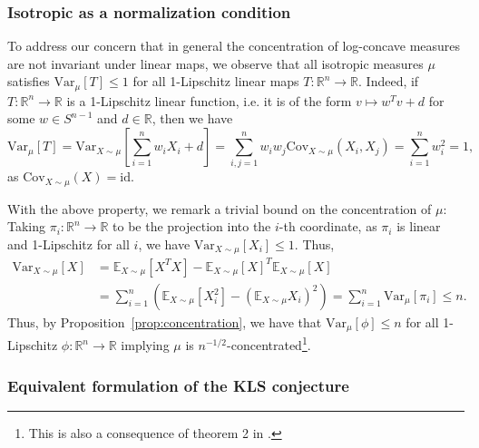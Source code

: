 \subsubsection{Isotropic as a normalization condition}

To address our concern that in general the concentration of log-concave measures are not invariant under linear maps, 
we observe that all isotropic measures \(\mu\) satisfies \(\text{Var}_\mu[T] \le 1\) for all 1-Lipschitz linear maps 
\(T : \mathbb{R}^n \to \mathbb{R}\). Indeed, if 
\(T : \mathbb{R}^n \to \mathbb{R}\) is a 1-Lipschitz linear function, i.e. it is of the form \(v \mapsto w^T v + d\) 
for some \(w \in S^{n - 1}\) and \(d \in \mathbb{R}\), then we have
\[\text{Var}_{\mu}[T] = \text{Var}_{X \sim \mu}\left[\sum_{i = 1}^n w_i X_i + d\right] 
    = \sum_{i, j = 1}^n w_i w_j \text{Cov}_{X \sim \mu}(X_i, X_j) = \sum_{i = 1}^n w_i^2 = 1,\]
as \(\text{Cov}_{X \sim \mu}(X) = \text{id}\). 

With the above property, we remark a trivial bound on the concentration of \(\mu\):
Taking \(\pi_i : \mathbb{R}^n \to \mathbb{R}\) to be the projection into the \(i\)-th coordinate, 
as \(\pi_i\) is linear and 1-Lipschitz for all \(i\), we have \(\text{Var}_{X \sim \mu}[X_i] \le 1\).
Thus, 
\begin{align*}
  \text{Var}_{X \sim \mu}[X] & = \mathbb{E}_{X \sim \mu}[X^T X] - \mathbb{E}_{X \sim \mu}[X]^T \mathbb{E}_{X \sim \mu}[X]\\ 
    & = \sum_{i = 1}^n (\mathbb{E}_{X \sim \mu}[X_i^2] - (\mathbb{E}_{X \sim \mu}X_i)^2)
      = \sum_{i = 1}^n \text{Var}_\mu[\pi_i] \le n.
\end{align*}
Thus, by Proposition~\ref{prop:concentration}, we have that \(\text{Var}_\mu[\phi] \le n\) for all 
1-Lipschitz \(\phi : \mathbb{R}^n \to \mathbb{R}\) implying \(\mu\) is \(n^{-1/2}\)-concentrated\footnote{This is also a consequence of theorem 2 in \cite{Lee_2016}.}.


\subsubsection{Equivalent formulation of the KLS conjecture}

